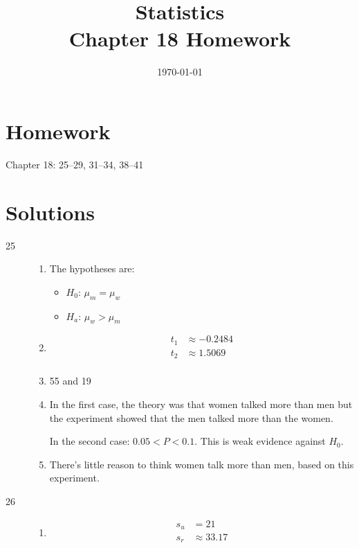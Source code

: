 \documentclass[letterpaper, landscape]{exam}
\title{Statistics \\ Chapter 18 Homework}
\date{\today}
\author{}
\begin{document}
  \maketitle

  \section{Homework}
  Chapter 18: 25--29, 31--34, 38--41

  \ifprintanswers{}
    \section{Solutions}
    \begin{description}

      \item[25] 
        \begin{enumerate}[label = {(\alph*)}]
          \item The hypotheses are:
            \begin{itemize}[itemsep = 0pt, label = {}]
              \item $H_0$: $\mu_m = \mu_w$
              \item $H_a$: $\mu_w > \mu_m$
            \end{itemize}

          \item
            \begin{align*}
              t_1 & \approx -0.2484 \\
              t_2 & \approx 1.5069 \\
            \end{align*}

          \item 55 and 19

          \item
            In the first case, the theory was that women talked more than men
            but the experiment showed that the men talked more than the women. 

            In the second case: $0.05 < P < 0.1$. This is weak evidence against
            $H_0$.

          \item There's little reason to think women talk more than men, based
            on this experiment.

        \end{enumerate}

      \item[26]
        \begin{enumerate}[label = {(\alph*)}]
          \item 
            \begin{align*}
              s_u & = 21 \\
              s_r & \approx 33.17 \\
            \end{align*}


\end{enumerate}
\end{description}
\end{document}
